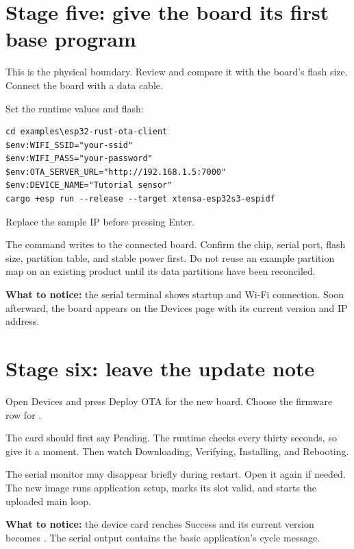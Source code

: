 \section{Stage five: give the board its first base program}

This is the physical boundary. Review  and compare it with the board's flash size. Connect the board with a data cable.

Set the runtime values and flash:

\begin{lstlisting}
cd examples\esp32-rust-ota-client
$env:WIFI_SSID="your-ssid"
$env:WIFI_PASS="your-password"
$env:OTA_SERVER_URL="http://192.168.1.5:7000"
$env:DEVICE_NAME="Tutorial sensor"
cargo +esp run --release --target xtensa-esp32s3-espidf
\end{lstlisting}

Replace the sample IP before pressing Enter.

\begin{warningbox}
The command writes to the connected board. Confirm the chip, serial port, flash size, partition table, and stable power first. Do not reuse an example partition map on an existing product until its data partitions have been reconciled.
\end{warningbox}

\textbf{What to notice:} the serial terminal shows startup and Wi-Fi connection. Soon afterward, the board appears on the Devices page with its current version and IP address.

\section{Stage six: leave the update note}

Open Devices and press Deploy OTA for the new board. Choose the firmware row for .

The card should first say Pending. The runtime checks every thirty seconds, so give it a moment. Then watch Downloading, Verifying, Installing, and Rebooting.

The serial monitor may disappear briefly during restart. Open it again if needed. The new image runs application setup, marks its slot valid, and starts the uploaded main loop.

\textbf{What to notice:} the device card reaches Success and its current version becomes . The serial output contains the basic application's cycle message.

